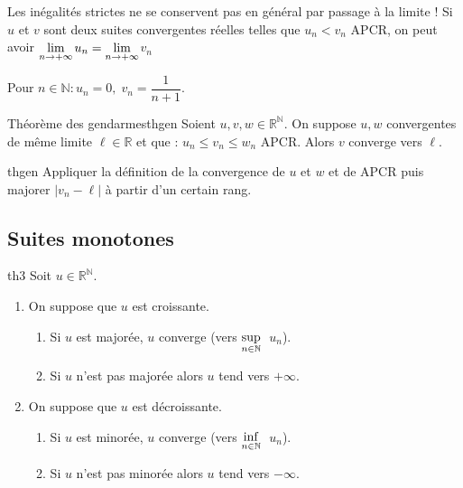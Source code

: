 \documentclass[12pt,a4paper]{report}
\begin{document}
\begin{remarque}
Les inégalités strictes ne se conservent pas en général par passage à la limite ! 
\newline Si $u$ et $v$ sont deux suites convergentes réelles telles que $u_n < v_n$ APCR, on peut avoir $\underset{n \rightarrow +\infty}{\rm{lim}}$$u_n = \underset{n \rightarrow +\infty}{\rm{lim}}$$v_n$
\end{remarque}  

\begin{exemple}
Pour $n \in \mathbb{N} : u_n = 0, \; v_n = \dfrac{1}{n+1}$.
\end{exemple} 

\begin{theoreme}{Théorème des gendarmes}{thgen}
Soient $u,v,w \in \mathbb{R}^\mathbb{N}$. On suppose $u,w$ convergentes de même limite $\ell \in \mathbb{R}$ et que : $u_n \leq v_n \leq w_n$ APCR. Alors $v$ converge vers $\ell$.
\end{theoreme}

\begin{principedemo}{thgen}
Appliquer la définition de la convergence de $u$ et $w$ et de APCR puis majorer $\lvert v_n - \ell \rvert$ à partir d'un certain rang.
\end{principedemo}


\subsection{Suites monotones}
\begin{theoreme}{}{th3}
Soit $u \in \mathbb{R}^\mathbb{N}$.
\begin{enumerate}
\item On suppose que $u$ est croissante.
\begin{enumerate} 
\item Si $u$ est majorée, $u$ converge (vers $\underset{n \in \mathbb{N}}{\rm{sup}}$ $\: u_n$).
\item Si $u$ n'est pas majorée alors $u$ tend vers $+\infty$.
\end{enumerate}
\item On suppose que $u$ est décroissante.
\begin{enumerate}
\item Si $u$ est minorée, $u$ converge (vers $\underset{n \in \mathbb{N}}{\rm{inf}}$ $\: u_n$).
\item Si $u$ n'est pas minorée alors $u$ tend vers $-\infty$.
\end{enumerate}
\end{enumerate}
\end{theoreme}
\end{document}
